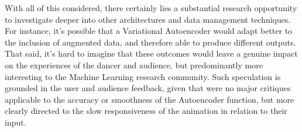 With all of this considered, there certainly lies a substantial research opportunity to investigate deeper into other architectures and data management techniques. For instance, it's possible that a Variational Autoencoder would adapt better to the inclusion of augmented data, and therefore able to produce different outputs. That said, it's hard to imagine that these outcomes would leave a genuine impact on the experiences of the dancer and audience, but predominantly more interesting to the Machine Learning research community. Such speculation is grounded in the user and audience feedback, given that were no major critiques applicable to the accuracy or smoothness of the Autoencoder function, but more clearly directed to the slow responsiveness of the animation in relation to their input.